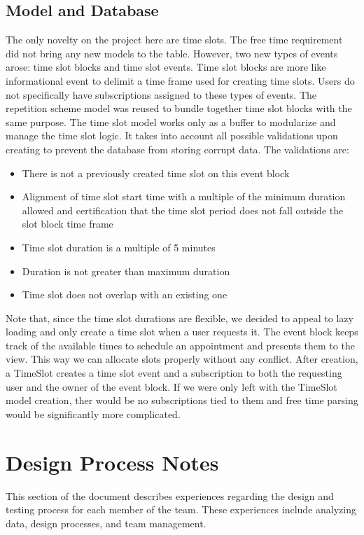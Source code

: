 \documentclass[11pt]{article}
\begin{document}
\subsection{Model and Database}
The only novelty on the project here are time slots. The free time requirement did not bring any new models to the table. However, two new types of events arose: time slot blocks and time slot events. Time slot blocks are more like informational event to delimit a time frame used for creating time slots. Users do not specifically have subscriptions assigned to these types of events. The repetition scheme model was reused to bundle together time slot blocks with the same purpose. The time slot model works only as a buffer to modularize and manage the time slot logic. It takes into account all possible validations upon creating to prevent the database from storing corrupt data. The validations are:
\begin{itemize}
\item There is not a previously created time slot on this event block
\item Alignment of time slot start time with a multiple of the minimum duration allowed and certification that the time slot period does not fall outside the slot block time frame
\item Time slot duration is a multiple of 5 minutes
\item Duration is not greater than maximum duration
\item Time slot does not overlap with an existing one
\end{itemize}
Note that, since the time slot durations are flexible, we decided to appeal to lazy loading and only create a time slot when a user requests it. The event block keeps track of the available times to schedule an appointment and presents them to the view. This way we can allocate slots properly without any conflict. 
After creation, a TimeSlot creates a time slot event and a subscription to both the requesting user and the owner of the event block. If we were only left with the TimeSlot model creation, ther would be no subscriptions tied to them and free time parsing would be significantly more complicated.


\section{Design Process Notes}

This section of the document describes experiences regarding the design and testing process for each member of the team.  These experiences include analyzing data, design processes, and team management.
\end{document}
